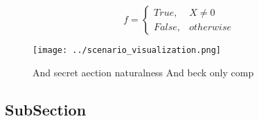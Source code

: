 \documentclass[a4paper]{article}
\begin{document}
\begin{equation}   f =
\begin{cases} True, & X \neq 0\\
False, & otherwise
\end{cases}
\end{equation}

\begin{figure}
\centering
\texttt{[image: ../scenario\_visualization.png]}
\caption{And secret aection naturalness And beck only comp
}
\end{figure}
 
\subsection{SubSection}
\end{document}
